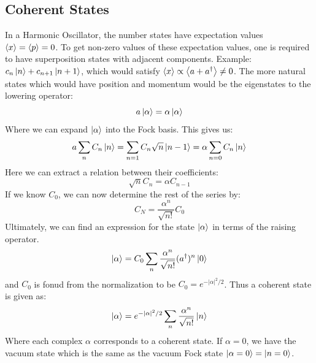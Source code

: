

\subsection{Coherent States}
In a Harmonic Oscillator, the number states have expectation values $\expval{x} = \expval{p} = 0$. To get non-zero values of these expectation values, one is required to have superposition states with adjacent components. Example: $c_n\ket{n} + c_{n+1} \ket{n+1}$, which would satisfy $\expval{x} \propto \expval{a + a^\dagger} \neq 0$. The more natural states which would have position and momentum would be the eigenstates to the lowering operator:
\begin{equation}
    a \ket{\alpha} = \alpha \ket{\alpha}
\end{equation}
Where we can expand $\ket{\alpha}$ into the Fock basis. This gives us:
\begin{align}
    a \sum_n C_n \ket{n} =     \sum_{n = 1} C_n \sqrt{n} \ket{n - 1} = \alpha \sum_{n = 0} C_n \ket{n}
\end{align}
Here we can extract a relation between their coefficients:
\begin{equation}
    \sqrt{n} C_n = \alpha C_{n - 1}
\end{equation}
If we know $C_0$, we can now determine the rest of the series by:
\begin{equation}
    C_N = \frac{\alpha^n}{\sqrt{n!}} C_0 
\end{equation}
Ultimately, we can find an expression for the state $\ket{\alpha}$ in terms of the raising operator.
\begin{equation}
    \ket{\alpha} = C_0 \sum_n \frac{\alpha^n} {\sqrt{n!}} (a^\dagger)^n \ket{0}
\end{equation}
and $C_0$ is fonud from the normalization to be $C_0 = e^{- |\alpha|^2 / 2}$. Thus a coherent state is given as:
\begin{equation}
    \ket{\alpha} = e^{-|\alpha|^2 / 2} \sum_n \frac{\alpha^n}{\sqrt{n!}} \ket{n}
\end{equation}
Where each complex $\alpha$ corresponds to a coherent state. If $\alpha = 0$, we have the vacuum state which is the same as the vacuum Fock state $\ket{\alpha = 0} = \ket{n = 0}$. 

